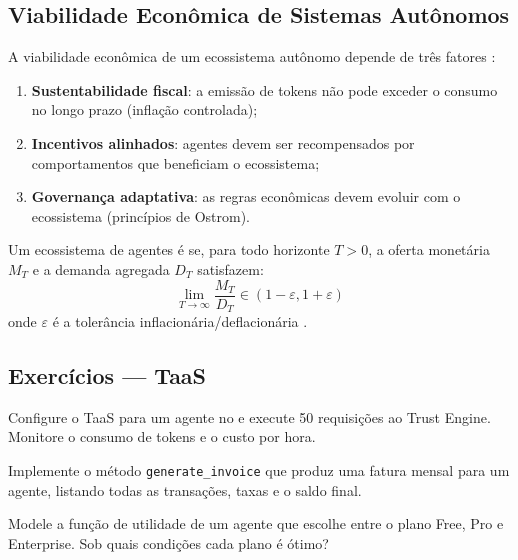 \subsection{Viabilidade Econômica de Sistemas Autônomos}

A viabilidade econômica de um ecossistema autônomo depende de
três fatores \cite{opencode2026ecosystem, ostrom1990governing}:

\begin{enumerate}
\item \textbf{Sustentabilidade fiscal}: a emissão de tokens não
pode exceder o consumo no longo prazo (inflação controlada);
\item \textbf{Incentivos alinhados}: agentes devem ser
recompensados por comportamentos que beneficiam o ecossistema;
\item \textbf{Governança adaptativa}: as regras econômicas devem
evoluir com o ecossistema (princípios de Ostrom).
\end{enumerate}

\begin{definicao}
Um ecossistema de agentes é 
se, para todo horizonte $T > 0$, a oferta monetária $M_T$ e a
demanda agregada $D_T$ satisfazem:
\[
\lim_{T \to \infty} \frac{M_T}{D_T} \in (1 - \varepsilon, 1 + \varepsilon)
\]
onde $\varepsilon$ é a tolerância inflacionária/deflacionária
\cite{opencode2026token}.
\end{definicao}

\subsection{Exercícios — TaaS}

\begin{exercicio}
Configure o TaaS para um agente no \opencodeeco{} e execute 50
requisições ao Trust Engine. Monitore o consumo de tokens e o
custo por hora.
\end{exercicio}

\begin{exercicio}
Implemente o método \lstinline{generate_invoice} que produz uma
fatura mensal para um agente, listando todas as transações,
taxas e o saldo final.
\end{exercicio}

\begin{exercicio}
Modele a função de utilidade de um agente que escolhe entre o
plano Free, Pro e Enterprise. Sob quais condições cada plano
é ótimo?
\end{exercicio}


